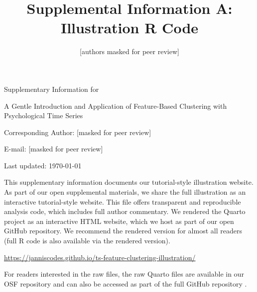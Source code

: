 \documentclass[man, 12pt, a4paper]{apa7}
\title{Supplemental Information A: Illustration R Code}
\author{[authors masked for peer review]}
\begin{document}
\begin{titlepage}
	{\noindent\Large Supplementary Information for \par}
	\vspace{0.5cm}
	{\noindent\Large A Gentle Introduction and Application of Feature-Based Clustering with Psychological Time Series\par}
	\vspace{1.5cm}
	{\noindent\LARGE\bfseries \thetitle \par}
	\vspace{2cm}
	{\noindent\Large\itshape \theauthor \par}
	\vfill
	\noindent Corresponding Author: [masked for peer review]\par
	\noindent E-mail: [masked for peer review]\par
	\vfill

	{\noindent Last updated: \today\par}
\end{titlepage}

\begin{center}
   \textbf{\thetitle} 
\end{center}

This supplementary information documents our tutorial-style illustration website. As part of our open supplemental materials, we share the full illustration as an interactive tutorial-style website. This file offers transparent and reproducible analysis code, which includes full author commentary. We rendered the Quarto project as an interactive HTML website, which we host as part of our open GitHub repository. We recommend the rendered version for almost all readers (full R code is also available via the rendered version).

\vspace{.5cm}
\begin{tcolorbox}
    \vspace{0.2cm} \centering 
    \href{https://janniscodes.github.io/ts-feature-clustering-illustration/}{https://janniscodes.github.io/ts-feature-clustering-illustration/}
    \vspace{0.2cm} 
\end{tcolorbox}

For readers interested in the raw files, the raw Quarto files are available in our OSF repository \citep[see][]{KreienkampMasked-clust-osf} and can also be accessed as part of the full GitHub repository \citep[][]{KreienkampMasked-clust-github}. 

\printbibliography
\end{document}
